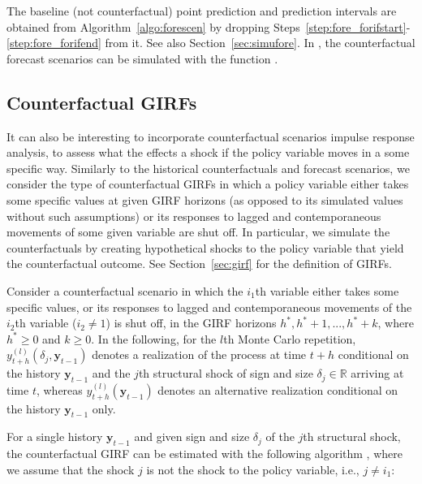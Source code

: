 \documentclass[nojss]{jss}
\begin{document}
The baseline (not counterfactual) point prediction and prediction intervals are obtained from Algorithm~\ref{algo:forescen} by dropping Steps~\ref{step:fore_forifstart}-\ref{step:fore_forifend} from it. See also Section~\ref{sec:simufore}. In , the counterfactual forecast scenarios can be simulated with the function .


\subsection{Counterfactual GIRFs}\label{sec:countgirf}

It can also be interesting to incorporate counterfactual scenarios impulse response analysis, to assess what the effects a shock if the policy variable moves in a some specific way. Similarly to the historical counterfactuals and forecast scenarios, we consider the type of counterfactual GIRFs in which a policy variable either takes some specific values at given GIRF horizons (as opposed to its simulated values without such assumptions) or its responses to lagged and contemporaneous movements of some given variable are shut off. In particular, we simulate the counterfactuals by creating hypothetical shocks to the policy variable that yield the counterfactual outcome. See Section~\ref{sec:girf} for the definition of GIRFs.

Consider a counterfactual scenario in which the $i_1$th variable either takes some specific values, or its responses to lagged and contemporaneous movements of the $i_2$th variable ($i_2\neq 1$) is shut off, in the GIRF horizons $h^*, h^*+1,...,h^*+k$, where $h^*\geq 0$ and $k\geq 0$. In the following, for the $l$th Monte Carlo repetition, $y_{t+h}^{(l)}(\delta_j,\boldsymbol{y}_{t-1})$ denotes a realization of the process at time $t+h$ conditional on the history $\boldsymbol{y}_{t-1}$ and the $j$th structural shock of sign and size $\delta_j \in\mathbb{R}$ arriving at time $t$, whereas $y_{t+h}^{(l)}(\boldsymbol{y}_{t-1})$ denotes an alternative realization conditional on the history $\boldsymbol{y}_{t-1}$ only.

For a single history $\boldsymbol{y}_{t-1}$ and given sign and size $\delta_j$ of the $j$th structural shock, the counterfactual GIRF can be estimated with the following algorithm \citep[adapted from the GIRF algorithm in][Appendix~B]{Lanne+Virolainen:2024}, where we assume that the shock $j$ is not the shock to the policy variable, i.e., $j\neq i_1$:
\end{document}
